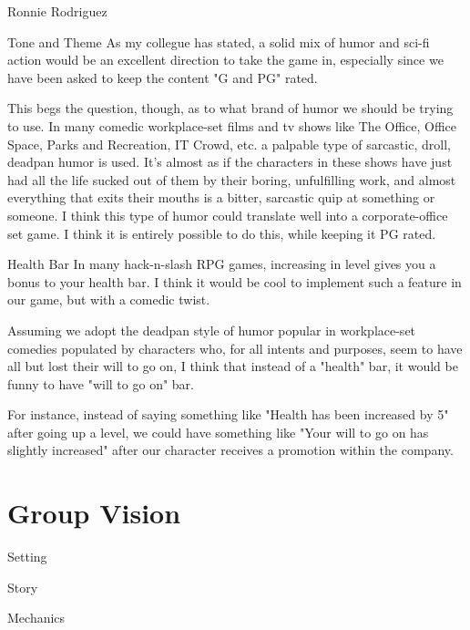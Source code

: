 \documentclass[12pt]{report}
\begin{document}
\begin{section}{Ronnie Rodriguez}
\begin{subsection}{Tone and Theme}
As my collegue has stated, a solid mix of humor and sci-fi action would
be an excellent direction to take the game in, especially since we have been asked to 
keep the content "G and PG" rated. 

This begs the question, though, as to what brand of humor we should
be trying to use. In many comedic workplace-set films and tv shows like 
The Office, Office Space, Parks and Recreation, IT Crowd, etc. a palpable type of 
sarcastic, droll, deadpan humor is used. It's almost as if the characters in 
these shows have just had all the life sucked out of them by their boring, 
unfulfilling work, and almost everything that exits their mouths is 
a bitter, sarcastic quip at something or someone. I think this type of humor 
could translate well into a corporate-office set game. I think it is entirely
possible to do this, while keeping it PG rated. 
\end{subsection}

\begin{subsection}{Health Bar}
In many hack-n-slash RPG games, increasing in level gives you a bonus to 
your health bar. I think it would be cool to implement such a feature in our game, 
but with a comedic twist. 

Assuming we adopt the deadpan style of humor popular in workplace-set comedies populated
by characters who, for all intents and purposes, seem to have all but lost their will 
to go on, I think that instead of a "health" bar, it would be funny to have "will to go on" bar. 

For instance, instead of saying something like "Health has been increased by 5" after going 
up a level, we could have something like "Your will to go on has slightly increased" after 
our character receives a promotion within the company.
\end{subsection}
\end{section}




\chapter{Group Vision}


\begin{section}{Setting}
\end{section}

\begin{section}{Story}
\end{section}

\begin{section}{Mechanics}
\end{section}
\end{document}
